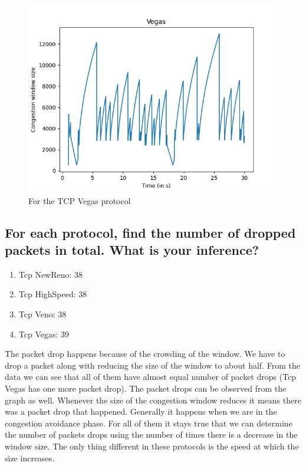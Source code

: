\documentclass{article}
\begin{document}
\begin{figure}[H]
    \centering
    \includegraphics[scale = 0.8]{Q1/outputs/plots/Vegas.png}
    \caption{For the TCP Vegas protocol}
\end{figure}


\subsection{For each protocol, find the number of dropped packets in total. What is your
inference?}
\begin{enumerate}
    \item Tcp NewReno: 38 
    \item Tcp HighSpeed: 38
    \item Tcp Veno: 38
    \item Tcp Vegas: 39
\end{enumerate}

The packet drop happens because of the crowding of the window. We have to drop a packet along with reducing the size of the window to about half. From the data we can see that all of them have almost equal number of packet drops (Tcp Vegas has one more packet drop). The packet drops can be observed from the graph as well. Whenever the size of the congestion window reduces it means there was a packet drop that happened. Generally it happens when we are in the congestion avoidance phase. For all of them it stays true that we can determine the number of packets drops using the number of times there is a decrease in the window size. The only thing different in these protocols is the speed at which the size increases.
\end{document}
